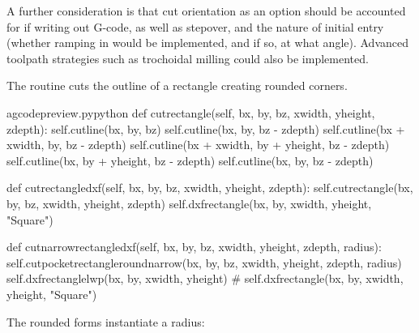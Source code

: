 \documentclass{ltxdoc}
\begin{document}
A further consideration is that cut orientation as an option should be accounted for if writing out G-code, as well as stepover, and the nature of initial entry (whether ramping in would be implemented, and if so, at what angle). Advanced toolpath strategies such as trochoidal milling could also be implemented.

The routine  cuts the outline of a rectangle creating rounded corners.

\lstset{firstnumber=\thegcpy}
\begin{writecode}{a}{gcodepreview.py}{python}
    def cutrectangle(self, bx, by, bz, xwidth, yheight, zdepth):
        self.cutline(bx, by, bz)
        self.cutline(bx, by, bz - zdepth)
        self.cutline(bx + xwidth, by, bz - zdepth)
        self.cutline(bx + xwidth, by + yheight, bz - zdepth)
        self.cutline(bx, by + yheight, bz - zdepth)
        self.cutline(bx, by, bz - zdepth)

    def cutrectangledxf(self, bx, by, bz, xwidth, yheight, zdepth):
        self.cutrectangle(bx, by, bz, xwidth, yheight, zdepth)
        self.dxfrectangle(bx, by, xwidth, yheight, "Square")

    def cutnarrowrectangledxf(self, bx, by, bz, xwidth, yheight, zdepth, radius):
        self.cutpocketrectangleroundnarrow(bx, by, bz, xwidth, yheight, zdepth, radius)
        self.dxfrectanglelwp(bx, by, xwidth, yheight)
#        self.dxfrectangle(bx, by, xwidth, yheight, "Square")

\end{writecode}
\addtocounter{gcpy}{17}

The rounded forms instantiate a radius:
\end{document}
